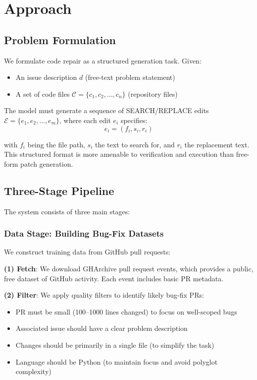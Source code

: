 \documentclass{article} %
\begin{document}
\section{Approach}

\subsection{Problem Formulation}

We formulate code repair as a structured generation task. Given:
\begin{itemize}
    \item An issue description $d$ (free-text problem statement)
    \item A set of code files $\mathcal{C} = \{c_1, c_2, \ldots, c_n\}$ (repository files)
\end{itemize}

The model must generate a sequence of SEARCH/REPLACE edits $\mathcal{E} = \{e_1, e_2, \ldots, e_m\}$, where each edit $e_i$ specifies:
\begin{equation}
e_i = (f_i, s_i, r_i)
\end{equation}

with $f_i$ being the file path, $s_i$ the text to search for, and $r_i$ the replacement text. This structured format is more amenable to verification and execution than free-form patch generation.

\subsection{Three-Stage Pipeline}

The system consists of three main stages:

\subsubsection{Data Stage: Building Bug-Fix Datasets}

We construct training data from GitHub pull requests:

\textbf{(1) Fetch}: We download GHArchive pull request events, which provides a public, free dataset of GitHub activity. Each event includes basic PR metadata.

\textbf{(2) Filter}: We apply quality filters to identify likely bug-fix PRs:
\begin{itemize}
    \item PR must be small (100--1000 lines changed) to focus on well-scoped bugs
    \item Associated issue should have a clear problem description
    \item Changes should be primarily in a single file (to simplify the task)
    \item Language should be Python (to maintain focus and avoid polyglot complexity)
\end{itemize}
\end{document}
